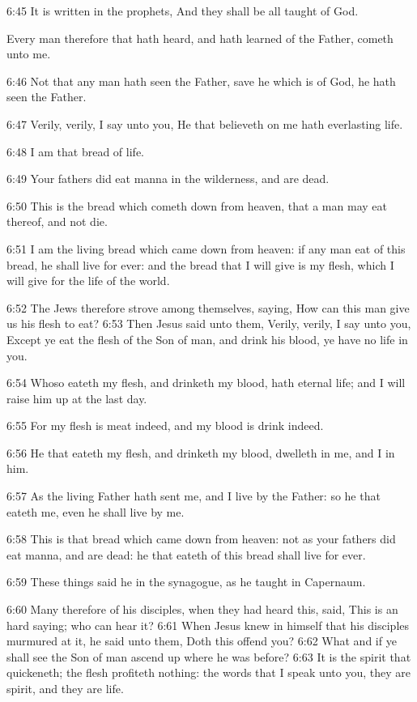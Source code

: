 6:45 It is written in the prophets, And they shall be all taught of
God.

Every man therefore that hath heard, and hath learned of the Father,
cometh unto me.

6:46 Not that any man hath seen the Father, save he which is of God,
he hath seen the Father.

6:47 Verily, verily, I say unto you, He that believeth on me hath
everlasting life.

6:48 I am that bread of life.

6:49 Your fathers did eat manna in the wilderness, and are dead.

6:50 This is the bread which cometh down from heaven, that a man may
eat thereof, and not die.

6:51 I am the living bread which came down from heaven: if any man eat
of this bread, he shall live for ever: and the bread that I will give
is my flesh, which I will give for the life of the world.

6:52 The Jews therefore strove among themselves, saying, How can this
man give us his flesh to eat?  6:53 Then Jesus said unto them, Verily,
verily, I say unto you, Except ye eat the flesh of the Son of man, and
drink his blood, ye have no life in you.

6:54 Whoso eateth my flesh, and drinketh my blood, hath eternal life;
and I will raise him up at the last day.

6:55 For my flesh is meat indeed, and my blood is drink indeed.

6:56 He that eateth my flesh, and drinketh my blood, dwelleth in me,
and I in him.

6:57 As the living Father hath sent me, and I live by the Father: so
he that eateth me, even he shall live by me.

6:58 This is that bread which came down from heaven: not as your
fathers did eat manna, and are dead: he that eateth of this bread
shall live for ever.

6:59 These things said he in the synagogue, as he taught in Capernaum.

6:60 Many therefore of his disciples, when they had heard this, said,
This is an hard saying; who can hear it?  6:61 When Jesus knew in
himself that his disciples murmured at it, he said unto them, Doth
this offend you?  6:62 What and if ye shall see the Son of man ascend
up where he was before?  6:63 It is the spirit that quickeneth; the
flesh profiteth nothing: the words that I speak unto you, they are
spirit, and they are life.

